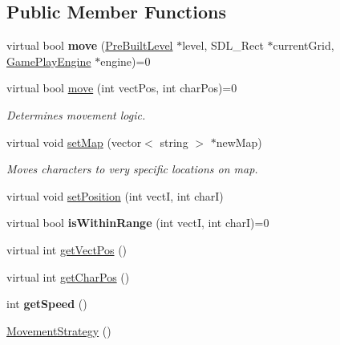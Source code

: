 \subsection*{Public Member Functions}
\begin{DoxyCompactItemize}
\item 
\hypertarget{class_movement_strategy_af94d4e293fe0328e1e51c6e67d539bff}{}\label{class_movement_strategy_af94d4e293fe0328e1e51c6e67d539bff} 
virtual bool {\bfseries move} (\hyperlink{class_pre_built_level}{Pre\+Built\+Level} $\ast$level, S\+D\+L\+\_\+\+Rect $\ast$current\+Grid, \hyperlink{class_game_play_engine}{Game\+Play\+Engine} $\ast$engine)=0
\item 
\hypertarget{class_movement_strategy_aae0f9fb25af037c5681fa2e16bcd23f9}{}\label{class_movement_strategy_aae0f9fb25af037c5681fa2e16bcd23f9} 
virtual bool \hyperlink{class_movement_strategy_aae0f9fb25af037c5681fa2e16bcd23f9}{move} (int vect\+Pos, int char\+Pos)=0
\begin{DoxyCompactList}\small\item\em Determines movement logic. \end{DoxyCompactList}\item 
virtual void \hyperlink{class_movement_strategy_a43b62810779a96206a3904cb703a65d3}{set\+Map} (vector$<$ string $>$ $\ast$new\+Map)
\begin{DoxyCompactList}\small\item\em Moves characters to very specific locations on map. \end{DoxyCompactList}\item 
virtual void \hyperlink{class_movement_strategy_a463bed0000abe0953b1ca6549498775c}{set\+Position} (int vectI, int charI)
\item 
\hypertarget{class_movement_strategy_abb3c49d97233d77548579f569ef644d6}{}\label{class_movement_strategy_abb3c49d97233d77548579f569ef644d6} 
virtual bool {\bfseries is\+Within\+Range} (int vectI, int charI)=0
\item 
virtual int \hyperlink{class_movement_strategy_a60556658ea26947e4e7a7e834b1a852b}{get\+Vect\+Pos} ()
\item 
virtual int \hyperlink{class_movement_strategy_a5ab8ea263679392461bd14e603edf7e8}{get\+Char\+Pos} ()
\item 
\hypertarget{class_movement_strategy_a15e1afd80d1725557f49597c5c31a0e7}{}\label{class_movement_strategy_a15e1afd80d1725557f49597c5c31a0e7} 
int {\bfseries get\+Speed} ()
\item 
\hyperlink{class_movement_strategy_a2d5e9218c78466ba67ca7b3f4e51c2d8}{Movement\+Strategy} ()

\end{DoxyCompactItemize}
